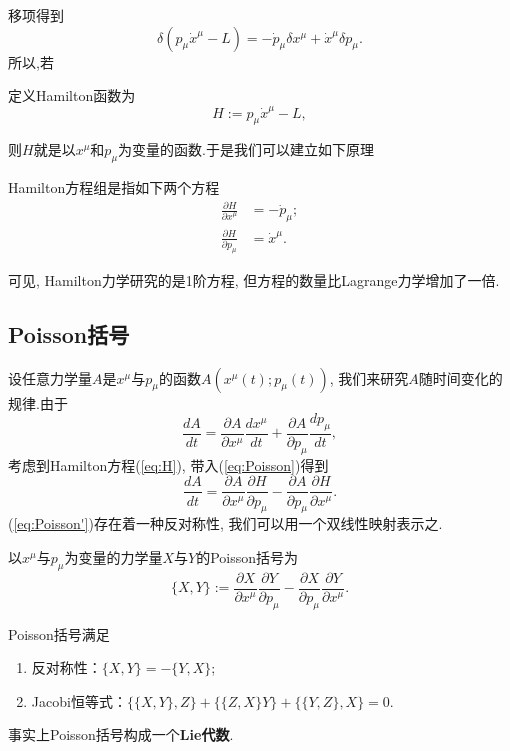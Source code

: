		移项得到
		\begin{equation}\label{eq:delta H}
		\delta(p_\mu{\dot{x}}^\mu-L)=-{\dot{p}}_\mu\delta x^\mu+{\dot{x}}^\mu\delta p_\mu.
		\end{equation}
		所以,若
		\begin{definition}
		定义Hamilton函数为
		\begin{equation}
			H:=p_\mu{\dot{x}}^\mu-L,
		\end{equation}
		\end{definition}
		则$H$就是以$x^\mu$和$p_\mu$为变量的函数.于是我们可以建立如下原理
		\begin{theorem}
		Hamilton方程组是指如下两个方程
		\begin{equation}
			\begin{split}\label{eq:H}
				\frac{\partial H}{\partial x^\mu}&=-{\dot{p}}_\mu;\\
				\frac{\partial H}{\partial p_\mu}&={\dot{x}}^\mu.
			\end{split}
		\end{equation}
		\end{theorem}
		可见, Hamilton力学研究的是1阶方程, 但方程的数量比Lagrange力学增加了一倍.

	\subsection{Poisson括号}
		设任意力学量$A$是$x^\mu$与$p_\mu$的函数$A(x^\mu(t);p_\mu(t))$, 我们来研究$A$随时间变化的规律.由于
		\begin{equation}\label{eq:Poisson}
		\frac{dA}{dt}=\frac{\partial A}{\partial x^\mu}\frac{d x^\mu}{dt}+\frac{\partial A}{\partial p_\mu}\frac{dp_\mu}{dt},
		\end{equation}
		考虑到Hamilton方程(\ref{eq:H}), 带入(\ref{eq:Poisson})得到
		\begin{equation}\label{eq:Poisson'}
		\frac{dA}{dt}=\frac{\partial A}{\partial x^\mu}\frac{\partial H}{\partial p_\mu}-\frac{\partial A}{\partial p_\mu}\frac{\partial H}{\partial x^\mu}.
		\end{equation}
		(\ref{eq:Poisson'})存在着一种反对称性, 我们可以用一个双线性映射表示之.
		\begin{definition}
		以$x^\mu$与$p_\mu$为变量的力学量$X$与$Y$的Poisson括号为
		\begin{equation}\label{eq:PB}
			\{X,Y\}:=\frac{\partial X}{\partial x^\mu}\frac{\partial Y}{\partial p_\mu}-\frac{\partial X}{\partial p_\mu}\frac{\partial Y}{\partial x^\mu}.
		\end{equation}
		\end{definition}
		\begin{remark}
			Poisson括号满足
			\begin{enumerate}
				\item 反对称性：$\{X,Y\}=-\{Y,X\}$;
				\item Jacobi恒等式：$\{\{X,Y\},Z\}+\{\{Z,X\}Y\}+\{\{Y,Z\},X\}=0$.
			\end{enumerate}
			事实上Poisson括号构成一个\textbf{Lie代数}.
		\end{remark}

